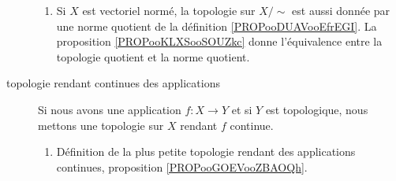 \begin{description}
\begin{enumerate}
			\item
			      Si \( X\) est vectoriel normé, la topologie sur \( X/\sim\) est aussi donnée par une norme quotient de la définition \ref{PROPooDUAVooEfrEGI}. La proposition \ref{PROPooKLXSooSOUZkc} donne l'équivalence entre la topologie quotient et la norme quotient.
		\end{enumerate}
	\item[topologie rendant continues des applications]
		Si nous avons une application \( f\colon X\to Y\) et si \( Y\) est topologique, nous mettons une topologie sur \( X\) rendant \( f\) continue.
		\begin{enumerate}
			\item
			      Définition de la plus petite topologie rendant des applications continues, proposition \ref{PROPooGOEVooZBAOQh}.
		\end{enumerate}
\end{description}

